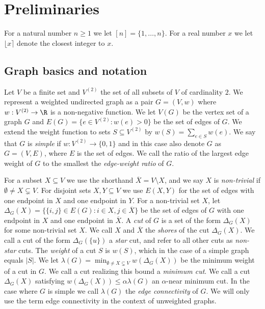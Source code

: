 \section{Preliminaries}
For a natural number $n \ge 1$ we let $[n] = \{1, \ldots, n\}$.  For a real number $x$ we let $\lfloor x \rceil$ denote the closest integer to $x$.

\subsection{Graph basics and notation}
Let $V$ be a finite set and $V^{(2)}$ the set of all subsets of $V$ of cardinality $2$.  We represent a weighted undirected 
graph as a pair $G = (V,w)$ where $w: V^{(2)} \rightarrow \R$ is a non-negative function.  We let $V(G)$ be the vertex set of a graph $G$ and 
$E(G) = \{ e \in V^{(2)}: w(e) > 0\}$ be the set of edges of $G$.  We extend the weight function to sets $S \subseteq V^{(2)}$ by $w(S) = \sum_{e \in S} w(e)$.
We say that $G$ is \emph{simple} if $w: V^{(2)} \rightarrow \{0,1\}$ and in this case also denote $G$ as $G = (V,E)$, where $E$ is the set of edges.  We call the 
ratio of the largest edge weight of $G$ to the smallest the \emph{edge-weight ratio} of $G$.


For a subset $X \subseteq V$ we use the shorthand $\overline{X} = V \setminus X$, and we say $X$ is \emph{non-trivial} if $\emptyset \ne X \subsetneq V$.  
For disjoint sets $X,Y \subseteq V$ we use $E(X,Y)$ for the set of edges with one endpoint in $X$ and one endpoint in $Y$.
For a non-trivial set $X$, let $\Delta_G(X) = \{ \{i,j\} \in E(G) : i \in X, j \in \overline{X}\}$ be the set of edges 
of $G$ with one endpoint in $X$ and one endpoint in $\overline{X}$.  A \emph{cut} of $G$ is a set of the form $\Delta_G(X)$ for some non-trivial 
set $X$.  We call $X$ and $\overline{X}$ the \emph{shores} of the cut $\Delta_G(X)$.  We call a cut of the form $\Delta_G(\{u\})$ a \emph{star} cut, and refer 
to all other cuts as \emph{non-star} cuts.  The \emph{weight} of a cut $S$ is $w(S)$, which in the 
case of a simple graph equals $|S|$.  We let $\lambda(G) = \min_{\emptyset \ne X \subsetneq V} w(\Delta_G(X))$ be the minimum weight of a cut in $G$.  
We call a cut realizing this bound a \emph{minimum cut}.  We call a cut $\Delta_G(X)$ satisfying $w(\Delta_G(X)) \le \alpha \lambda(G)$ an $\alpha$-near minimum cut. 
In the case where $G$ is simple we call $\lambda(G)$ the \emph{edge connectivity} of $G$.  
We will only use the term edge connectivity in the context of unweighted graphs.


